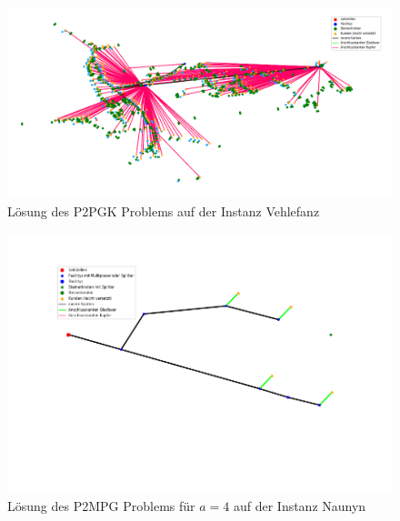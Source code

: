 \documentclass[11pt,a4paper]{article}
\theoremstyle{my_th_style1}
\begin{document}
\begin{figure}[!htbp]
	\begin{center}
		\begin{minipage}{15.0cm}
			\includegraphics[width=1\textwidth]{./Bilder/P2PGK_Vehlefanz_demand1_duration0}
			\caption{Lösung des P2PGK Problems auf der Instanz Vehlefanz}
			\label{p2pgk_v_pic}
		\end{minipage}
	\end{center}
\end{figure}

\begin{figure}[!htbp]
	\begin{center}
		\begin{minipage}{8.0cm}
			\includegraphics[width=1\textwidth]{./Bilder/P2MPG_Naunyn_demand1_duration0}
			\caption{Lösung des P2MPG Problems f\"ur \(a=4\) auf der Instanz Naunyn}
			\label{p2mpg_n_pic}
		\end{minipage}
	\end{center}
\end{figure}
\end{document}
